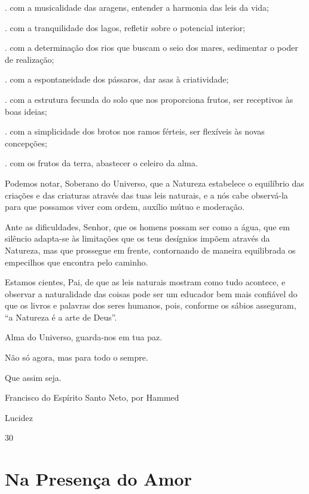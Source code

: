 \documentclass[12pt,a4paper]{article}
\begin{document}
			. com a musicalidade das aragens, entender a harmonia das leis da vida;

			. com a tranquilidade dos lagos, refletir sobre o potencial interior;

			. com a determina\c{c}\~ao dos rios que buscam o seio dos mares, sedimentar o poder de realiza\c{c}\~ao;

			. com a espontaneidade dos p\'assaros, dar asas \`a criatividade;

			. com a estrutura fecunda do solo que nos proporciona frutos, ser receptivos \`as boas ideias;

			. com a simplicidade dos brotos nos ramos f\'erteis, ser flex\'iveis \`as novas concep\c{c}\~oes;

			. com os frutos da terra, abastecer o celeiro da alma.

			Podemos notar, Soberano do Universo, que a Natureza estabelece o equil\'ibrio das cria\c{c}\~oes e das criaturas atrav\'es das tuas leis naturais, e a n\'os cabe observ\'a-la para que possamos viver com ordem, aux\'ilio m\'utuo e modera\c{c}\~ao.

			Ante as dificuldades, Senhor, que os homens possam ser como a \'agua, que em sil\^encio adapta-se \`as limita\c{c}\~oes que os teus des\'ignios imp\~oem atrav\'es da Natureza, mas que prossegue em frente, contornando de maneira equilibrada os empecilhos que encontra pelo caminho.

			Estamos cientes, Pai, de que as leis naturais mostram como tudo acontece, e observar a naturalidade das coisas pode ser um educador bem mais confi\'avel do que os livros e palavras dos seres humanos, pois, conforme os s\'abios asseguram, \textquotedblleft a Natureza \'e a arte de Deus\textquotedblright.

			Alma do Universo, guarda-nos em tua paz.

			N\~ao s\'o agora, mas para todo o sempre.

			Que assim seja.

			Francisco do Esp\'irito Santo Neto, por Hammed

			Lucidez

			30

	\section{Na Presen\c{c}a do Amor}
		\begin{flushright}
		\end{flushright}
\end{document}
